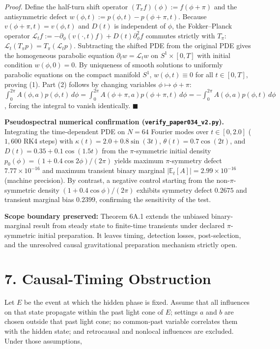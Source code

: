 \documentclass[
  american,
  11pt,
  letterpaper,
]{article}
\begin{document}
\emph{Proof.} Define the half-turn shift operator \((T_\pi f)(\phi) := f(\phi + \pi)\) and the antisymmetric defect \(w(\phi, t) := p(\phi, t) - p(\phi + \pi, t)\). Because \(v(\phi + \pi, t) = v(\phi, t)\) and \(D(t)\) is independent of \(\phi\), the Fokker--Planck operator \(\mathcal{L}_t f := -\partial_\phi(v(\cdot, t) f) + D(t)\partial_\phi^2 f\) commutes strictly with \(T_\pi\): \(\mathcal{L}_t(T_\pi p) = T_\pi(\mathcal{L}_t p)\). Subtracting the shifted PDE from the original PDE gives the homogeneous parabolic equation \(\partial_t w = \mathcal{L}_t w\) on \(S^1 \times [0, T]\) with initial condition \(w(\phi, 0) = 0\). By uniqueness of smooth solutions to uniformly parabolic equations on the compact manifold \(S^1\), \(w(\phi, t) \equiv 0\) for all \(t \in [0, T]\), proving (1). Part (2) follows by changing variables \(\phi \mapsto \phi + \pi\): \(\int_0^{2\pi} A(\phi, a) p(\phi, t)\,d\phi = \int_0^{2\pi} A(\phi+\pi, a) p(\phi+\pi, t)\,d\phi = -\int_0^{2\pi} A(\phi, a) p(\phi, t)\,d\phi\), forcing the integral to vanish identically. \ensuremath{\blacksquare}

\textbf{Pseudospectral numerical confirmation (\nolinkurl{verify_paper034_v2.py}).} Integrating the time-dependent PDE on \(N = 64\) Fourier modes over \(t \in [0, 2.0]\) (\(1{,}600\) RK4 steps) with \(\kappa(t) = 2.0 + 0.8\sin(3t)\), \(\theta(t) = 0.7\cos(2t)\), and \(D(t) = 0.35 + 0.1\cos(1.5t)\) from the \(\pi\)-symmetric initial density \(p_0(\phi) = (1 + 0.4\cos 2\phi)/(2\pi)\) yields maximum \(\pi\)-symmetry defect \(7.77 \times 10^{-16}\) and maximum transient binary marginal \(|\mathbb{E}_t[A]| = 2.99 \times 10^{-16}\) (machine precision). By contrast, a negative control starting from the non-\(\pi\)-symmetric density \((1 + 0.4\cos\phi)/(2\pi)\) exhibits symmetry defect \(0.2675\) and transient marginal bias \(0.2399\), confirming the sensitivity of the test.

\textbf{Scope boundary preserved:} Theorem 6A.1 extends the unbiased binary-marginal result from steady state to finite-time transients under declared \(\pi\)-symmetric initial preparation. It leaves timing, detection losses, post-selection, and the unresolved causal gravitational preparation mechanism strictly open.

\section{7. Causal-Timing Obstruction}\label{causal-timing-obstruction}

Let \(E\) be the event at which the hidden phase is fixed. Assume that all influences on that state propagate within the past light cone of \(E\); settings \(a\) and \(b\) are chosen outside that past light cone; no common-past variable correlates them with the hidden state; and retrocausal and nonlocal influences are excluded. Under those assumptions,
\end{document}
